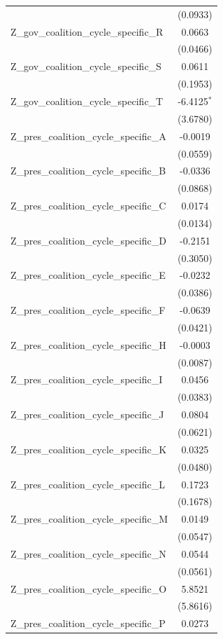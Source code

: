 \begin{tabular}{lc}
 & (0.0933) \\
Z\_gov\_coalition\_cycle\_specific\_R & 0.0663 \\
 & (0.0466) \\
Z\_gov\_coalition\_cycle\_specific\_S & 0.0611 \\
 & (0.1953) \\
Z\_gov\_coalition\_cycle\_specific\_T & -6.4125$^{*}$ \\
 & (3.6780) \\
Z\_pres\_coalition\_cycle\_specific\_A & -0.0019 \\
 & (0.0559) \\
Z\_pres\_coalition\_cycle\_specific\_B & -0.0336 \\
 & (0.0868) \\
Z\_pres\_coalition\_cycle\_specific\_C & 0.0174 \\
 & (0.0134) \\
Z\_pres\_coalition\_cycle\_specific\_D & -0.2151 \\
 & (0.3050) \\
Z\_pres\_coalition\_cycle\_specific\_E & -0.0232 \\
 & (0.0386) \\
Z\_pres\_coalition\_cycle\_specific\_F & -0.0639 \\
 & (0.0421) \\
Z\_pres\_coalition\_cycle\_specific\_H & -0.0003 \\
 & (0.0087) \\
Z\_pres\_coalition\_cycle\_specific\_I & 0.0456 \\
 & (0.0383) \\
Z\_pres\_coalition\_cycle\_specific\_J & 0.0804 \\
 & (0.0621) \\
Z\_pres\_coalition\_cycle\_specific\_K & 0.0325 \\
 & (0.0480) \\
Z\_pres\_coalition\_cycle\_specific\_L & 0.1723 \\
 & (0.1678) \\
Z\_pres\_coalition\_cycle\_specific\_M & 0.0149 \\
 & (0.0547) \\
Z\_pres\_coalition\_cycle\_specific\_N & 0.0544 \\
 & (0.0561) \\
Z\_pres\_coalition\_cycle\_specific\_O & 5.8521 \\
 & (5.8616) \\
Z\_pres\_coalition\_cycle\_specific\_P & 0.0273 \\

\end{tabular}
